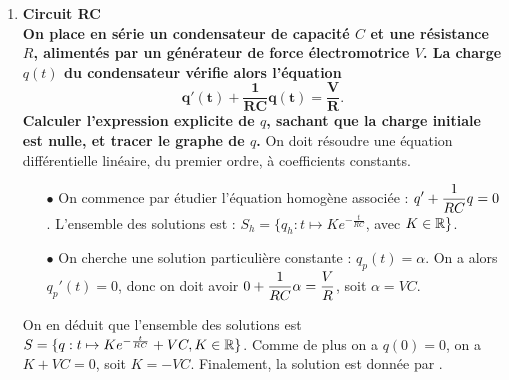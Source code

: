 \documentclass[a4paper, 11pt,reqno]{article}
\begin{document}
\begin{correction}
  \begin{enumerate}
    \item \textbf{Circuit RC}\\
          \textbf{On place en s\'erie un condensateur de capacit\'e $C$ et une r\'esistance $R$, aliment\'es par un g\'en\'erateur de force \'electromotrice $V$. La charge $q(t)$ du condensateur v\'erifie alors l'\'equation}
          $$\mathbf{q'(t) + \frac{1}{RC} q(t) = \frac{V}{R}.}$$
          \textbf{Calculer l'expression explicite de $q$, sachant que la charge initiale est nulle, et tracer le graphe de $q$.} On doit r\'esoudre une \'equation diff\'erentielle lin\'eaire, du premier ordre, \`a coefficients constants.
          \begin{itemize}
            \item[$\bullet$] On commence par \'etudier l'\'equation homog\`ene associ\'ee : $\displaystyle q' + \frac{1}{RC} q = 0$. L'ensemble des solutions est : $S_h = \{ q_h: t \mapsto  K e^{-\frac{t}{RC}}$, avec $K \in \mathbb{R}\}$.
            \item[$\bullet$] On cherche une solution particuli\`ere constante : $q_p(t) = \alpha$. On a alors $q_p'(t) = 0$, donc on doit avoir $0 +\displaystyle \frac{1}{RC} \alpha = \frac{V}{R}$, soit $\alpha = VC$.
          \end{itemize}
          On en d\'eduit que l'ensemble des solutions est $S = \{q : t\mapsto  K e^{-\frac{t}{RC}}+ VC, K \in \mathbb{R}\}$. Comme de plus on a $q(0) = 0$, on a $K + VC = 0$, soit $K=-VC$. Finalement, la solution est donn\'ee par .
          \begin{center}


\end{center}
\end{enumerate}
\end{correction}
\end{document}
